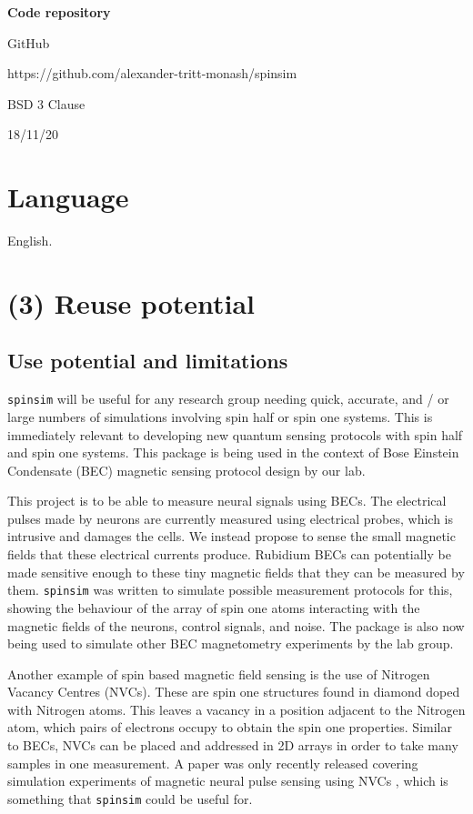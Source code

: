 \documentclass{jors}
\begin{document}
{\bf Code repository}

\begin{description}[noitemsep,topsep=0pt]
	\item[Name:] GitHub
	\item[Persistent identifier:] https://github.com/alexander-tritt-monash/spinsim
	\item[Licence:] BSD 3 Clause
	\item[Date published:] 18/11/20
\end{description}

\section*{Language}

English.

\section*{(3) Reuse potential}

	\subsection*{Use potential and limitations}
		\texttt{spinsim} will be useful for any research group needing quick, accurate, and / or large numbers of simulations involving spin half or spin one systems. This is immediately relevant to developing new quantum sensing protocols with spin half and spin one systems. This package is being used in the context of Bose Einstein Condensate (BEC) magnetic sensing protocol design by our lab.

		This project is to be able to measure neural signals using BECs. The electrical pulses made by neurons are currently measured using electrical probes, which is intrusive and damages the cells. We instead propose to sense the small magnetic fields that these electrical currents produce. Rubidium BECs can potentially be made sensitive enough to these tiny magnetic fields that they can be measured by them. \texttt{spinsim} was written to simulate possible measurement protocols for this, showing the behaviour of the array of spin one atoms interacting with the magnetic fields of the neurons, control signals, and noise. The package is also now being used to simulate other BEC magnetometry experiments by the lab group.

		Another example of spin based magnetic field sensing is the use of Nitrogen Vacancy Centres (NVCs). These are spin one structures found in diamond doped with Nitrogen atoms. This leaves a vacancy in a position adjacent to the Nitrogen atom, which pairs of electrons occupy to obtain the spin one properties. Similar to BECs, NVCs can be placed and addressed in 2D arrays in order to take many samples in one measurement. A paper was only recently released covering simulation experiments of magnetic neural pulse sensing using NVCs \cite{parashar_axon_2020}, which is something that \texttt{spinsim} could be useful for.
\end{document}
